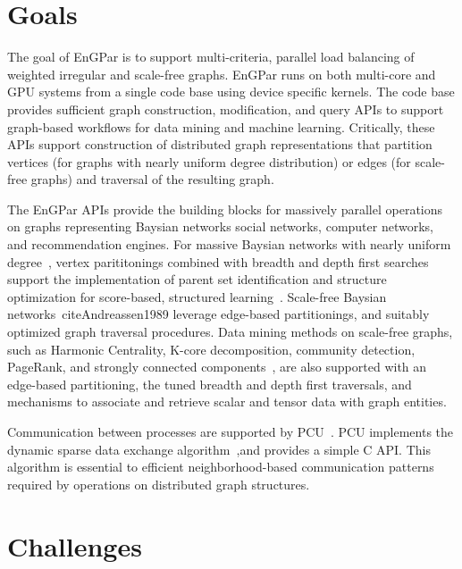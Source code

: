 \documentclass{article}
\begin{document}
\section{Goals}

The goal of EnGPar is to support multi-criteria, parallel load balancing of
weighted irregular and scale-free graphs.
EnGPar runs on both multi-core and GPU systems from a single code base using
device specific kernels.
The code base provides sufficient graph construction, modification, and query
APIs to support graph-based workflows for data mining and machine learning.
Critically, these APIs support construction of distributed graph representations
that partition vertices (for graphs with nearly uniform degree distribution) or
edges (for scale-free graphs) and traversal of the resulting graph.

The EnGPar APIs provide the building blocks for massively parallel operations on
graphs representing Baysian networks social networks, computer networks, and
recommendation engines.
For massive Baysian networks with nearly uniform degree~\cite{Andreassen1989},
vertex parititonings combined with breadth and depth first searches support the
implementation of parent set identification and structure optimization for
score-based, structured learning~\cite{Scanagatta2015}.
Scale-free Baysian networks~cite{Andreassen1989} leverage edge-based
partitionings, and suitably optimized graph traversal procedures.
Data mining methods on scale-free graphs, such as Harmonic Centrality, K-core
decomposition, community detection, PageRank, and strongly connected
components~\cite{slota_ipdps2016,slota_ipdps2017}, are also supported with an
edge-based partitioning, the tuned breadth and depth first traversals, and
mechanisms to associate and retrieve scalar and tensor data with graph entities.

Communication between processes are supported by PCU~\cite{ibanez2016pumi}.
PCU implements the dynamic sparse data exchange
algorithm~\cite{hoefler2010scalable},and provides a simple C API.
This algorithm is essential to efficient neighborhood-based communication patterns
required by operations on distributed graph structures.

\section{Challenges}
\end{document}
